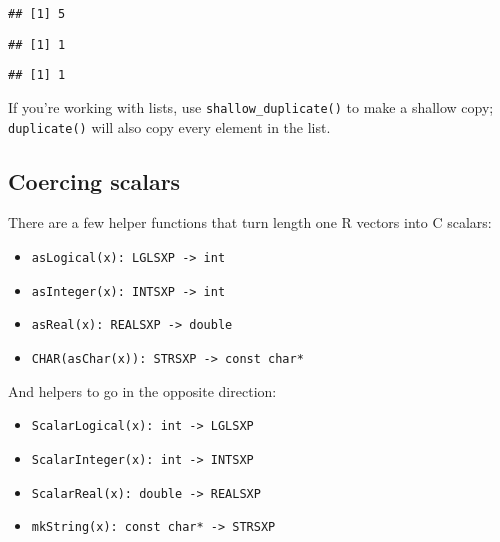 \begin{verbatim}
## [1] 5
\end{verbatim}

\begin{Shaded}
\begin{Highlighting}[]
\end{Highlighting}
\end{Shaded}

\begin{verbatim}
## [1] 1
\end{verbatim}

\begin{Shaded}
\begin{Highlighting}[]
\end{Highlighting}
\end{Shaded}

\begin{verbatim}
## [1] 1
\end{verbatim}

If you're working with lists, use \texttt{shallow\_duplicate()} to make
a shallow copy; \texttt{duplicate()} will also copy every element in the
list.

\hypertarget{coercing-scalars}{%
\subsection{Coercing scalars}\label{coercing-scalars}}

There are a few helper functions that turn length one R vectors into C
scalars:

\begin{itemize}
\tightlist
\item
  \texttt{asLogical(x):\ LGLSXP\ -\textgreater{}\ int}
\item
  \texttt{asInteger(x):\ INTSXP\ -\textgreater{}\ int}
\item
  \texttt{asReal(x):\ REALSXP\ -\textgreater{}\ double}
\item
  \texttt{CHAR(asChar(x)):\ STRSXP\ -\textgreater{}\ const\ char*}
\end{itemize}

And helpers to go in the opposite direction:

\begin{itemize}
\tightlist
\item
  \texttt{ScalarLogical(x):\ int\ -\textgreater{}\ LGLSXP}
\item
  \texttt{ScalarInteger(x):\ int\ -\textgreater{}\ INTSXP}
\item
  \texttt{ScalarReal(x):\ double\ -\textgreater{}\ REALSXP}
\item
  \texttt{mkString(x):\ const\ char*\ -\textgreater{}\ STRSXP}
\end{itemize}

